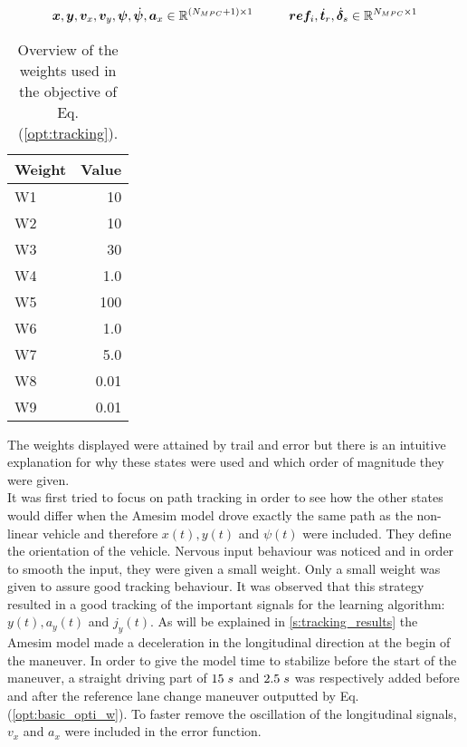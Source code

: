 \[\bm{x},\bm{y},\bm{v}_x,\bm{v}_y,\bm{\psi},\dot{\bm{\psi}},\bm{a}_x \in \mathbb{R}^{(N_{MPC}+1)\times1} \hspace{10mm}\bm{ref}_{i},\dot{\bm{t}}_r,\dot{\bm{\delta}}_s \in \mathbb{R}^{N_{MPC}\times1}\]


\begin{table}[h!]
	\centering
	\begin{tabular}{@{}lr@{}} 
		Weight    & Value\\ \midrule
		W1      & 10\\
		W2          & 10\\
		W3 	   & 30\\
		W4       & 1.0\\
		W5       & 100\\
		W6       & 1.0\\
		W7       & 5.0\\
		W8       & 0.01\\
		W9  & 0.01\\ \bottomrule
	\end{tabular}
	\caption{Overview of the weights used in the objective of Eq. (\ref{opt:tracking}).}
	\label{tab:weights}
\end{table}

The weights displayed were attained by trail and error but there is an intuitive explanation for why these states were used and which order of magnitude they were given.\\

It was first tried to focus on path tracking in order to see how the other states would differ when the Amesim model drove exactly the same path as the non-linear vehicle and therefore $x(t),y(t)$ and $\psi(t)$ were included. They define the orientation of the vehicle. Nervous input behaviour was noticed and in order to smooth the input, they were given a small weight. Only a small weight was given to assure good tracking behaviour. It was observed that this strategy resulted in a good tracking of the important signals for the learning algorithm: $y(t), a_y(t)$ and $j_y(t)$. As will be explained in \ref{s:tracking_results} the Amesim model made a deceleration in the longitudinal direction at the begin of the maneuver. In order to  give the model time to stabilize before the start of the maneuver, a straight driving part of $15\hspace{1mm}s$ and $2.5\hspace{1mm}s$ was respectively added before and after the reference lane change maneuver outputted by Eq. (\ref{opt:basic_opti_w}). To faster remove the oscillation of the longitudinal signals, $v_x$ and $a_x$ were included in the error function.\\

